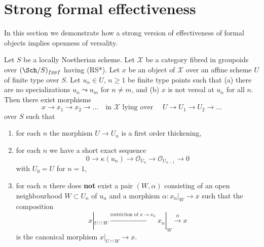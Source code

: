 \section{Strong formal effectiveness}
\label{section-strong-formal-effectiveness}

\noindent
In this section we demonstrate how a strong version of effectiveness
of formal objects implies openness of versality.

\begin{lemma}
\label{lemma-infinite-sequence-pre}
Let $S$ be a locally Noetherian scheme. Let $\mathcal{X}$ be a category
fibred in groupoids over $(\Sch/S)_{fppf}$ having (RS*).
Let $x$ be an object of
$\mathcal{X}$ over an affine scheme $U$ of finite type over $S$.
Let $u_n \in U$, $n \geq 1$ be finite type points such that
(a) there are no specializations $u_n \leadsto u_m$ for $n \not = m$, and
(b) $x$ is not versal at $u_n$ for all $n$. Then there exist morphisms
$$
x \to x_1 \to x_2 \to \ldots
\quad\text{in }\mathcal{X}\text{ lying over }\quad
U \to U_1 \to U_2 \to \ldots
$$
over $S$ such that
\begin{enumerate}
\item for each $n$ the morphism $U \to U_n$ is a first order
thickening,
\item for each $n$ we have a short exact sequence
$$
0 \to \kappa(u_n) \to \mathcal{O}_{U_n} \to \mathcal{O}_{U_{n - 1}} \to 0
$$
with $U_0 = U$ for $n = 1$,
\item for each $n$ there does {\bf not} exist a pair $(W, \alpha)$
consisting of an open neighbourhood $W \subset U_n$ of $u_n$
and a morphism $\alpha : x_n|_W \to x$
such that the composition
$$
x|_{U \cap W} \xrightarrow{\text{restriction of }x \to x_n}
x_n|_W \xrightarrow{\alpha} x
$$
is the canonical morphism $x|_{U \cap W} \to x$.
\end{enumerate}
\end{lemma}

